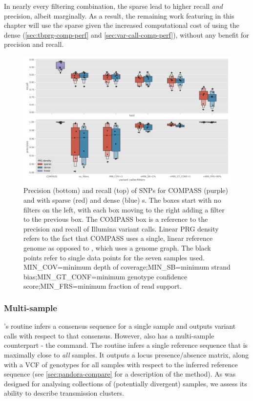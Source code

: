 In nearly every filtering combination, the sparse \panrg{} lead to higher recall \emph{and} precision, albeit marginally. As a result, the remaining work featuring \pandora{} in this chapter will use the sparse \panrg{} given the increased computational cost of using the dense \panrg{} (\autoref{sec:tbprg-comp-perf} and \autoref{sec:var-call-comp-perf}), without any benefit for precision and recall.

\begin{figure}
\begin{center}
\includegraphics[width=0.90\columnwidth]{Chapter2/Figs/pandora-precision-recall-filters-snps.png}
\caption{{Precision (bottom) and recall (top) of SNPs for COMPASS (purple) and \pandora{} with sparse (red) and dense (blue) \panrg{}s. The \pandora{} boxes start with no filters on the left, with each box moving to the right adding a filter to the previous box. The COMPASS box is a reference to the precision and recall of Illumina variant calls. Linear PRG density refers to the fact that COMPASS uses a single, linear reference genome as opposed to \pandora{}, which uses a genome graph. The black points refer to single data points for the seven samples used. MIN\_COV=minimum depth of coverage;MIN\_SB=minimum strand bias;MIN\_GT\_CONF=minimum genotype confidence score;MIN\_FRS=minimum fraction of read support.
{\label{fig:pandora-filters-snps}}%
}}
\end{center}
\end{figure}

\subsubsection{Multi-sample}

\pandora{}'s  routine infers a consensus sequence for a single sample and outputs variant calls with respect to that consensus. However, \pandora{} also has a multi-sample counterpart - the  command. The \compare{} routine infers a single reference sequence that is maximally close to \emph{all} samples. It outputs a locus presence/absence matrix, along with a VCF of genotypes for all samples with respect to the inferred reference sequence (see \autoref{sec:pandora-compare} for a description of the \compare{} method). As \compare{} was designed for analysing collections of (potentially divergent) samples, we assess its ability to describe \mtb{} transmission clusters. 

